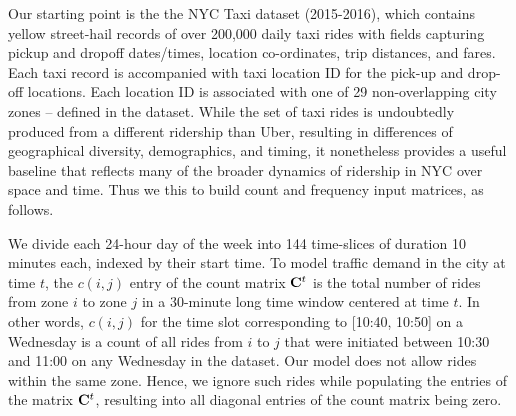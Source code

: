 Our starting point is the the NYC Taxi  dataset (2015-2016), which
contains yellow street-hail records of over 200,000 daily taxi rides with fields capturing pickup and dropoff dates/times, 
location co-ordinates, trip distances, and fares.
Each taxi record is accompanied with taxi location ID for the pick-up and drop-off locations. 
Each location ID is associated with one of 29 non-overlapping city zones -- defined in the
dataset.  While the set of taxi rides is undoubtedly produced from a different ridership than Uber, 
resulting in differences of geographical diversity, demographics, and timing, 
it nonetheless provides a useful baseline that reflects many of the broader dynamics of ridership in 
NYC over space and time.  Thus we this to build count and frequency input matrices, as follows.


We divide each 24-hour day of the week into 144 time-slices of duration 10 minutes each, indexed by their start 
time.  To model traffic demand in the city at time $t$, the $c(i,j)$ entry of the count matrix ${\mathbf{C}}^t$ is the total 
number of rides from zone $i$ to zone $j$ in a 30-minute long time window centered at time $t$. In other words, $c(i,j)$ for the time slot corresponding
to [10:40, 10:50] on a Wednesday is a count of all rides from $i$ to $j$ that were initiated between 10:30 and 11:00 
on any Wednesday in the dataset. Our model does not allow rides within the same zone. Hence, we ignore such rides while populating the entries of the matrix ${\mathbf{C}}^t$, resulting into all diagonal entries of the count matrix being zero.


